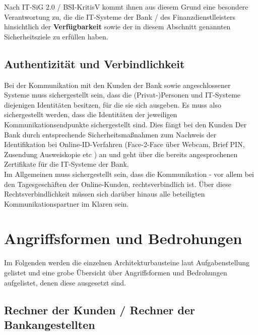 \noindent
Nach IT-SiG 2.0 / BSI-KritisV kommt ihnen aus diesem Grund eine besondere Verantwortung zu, die die IT-Systeme der Bank / des Finanzdienstlleisters hinsichtlich der \textbf{Verfügbarkeit} sowie der in diesem Abschnitt genannten Sicherheitsziele zu erfüllen haben.

\subsection{Authentizität und Verbindlichkeit}
Bei der Kommunikation mit den Kunden der Bank sowie angeschlossener Systeme muss sichergestellt sein, dass die (Privat-)Personen und IT-Systeme diejenigen Identitäten besitzen, für die sie sich ausgeben.
Es muss also sichergestellt werden, dass die Identitäten der jeweiligen Kommunikationsendpunkte sichergestellt sind.
Dies fängt bei den Kunden Der Bank durch entsprechende Sicherheitsmaßnahmen zum Nachweis der Identifikation bei Online-ID-Verfahren (Face-2-Face über Webcam, Brief PIN, Zusendung Ausweiskopie etc ) an und geht über die bereits angesprochenen Zertifikate für die IT-Systeme der Bank.\\
Im Allgemeinen muss sichergestellt sein, dass die Kommunikation - vor allem bei den Tagesgeschäften der Online-Kunden, rechtsverbindlich ist.
Über diese Rechtsverbindlichkeit müssen sich darüber hinaus alle beteiligten Kommunikationspartner im Klaren sein.


\section{Angriffsformen und Bedrohungen}

Im Folgenden werden die einzelnen Architekturbausteine laut Aufgabenstellung gelistet und eine grobe Übersicht über  Angriffsformen und Bedrohungen aufgelistet, denen diese ausgesetzt sind.

\subsection{Rechner der Kunden / Rechner der Bankangestellten}

